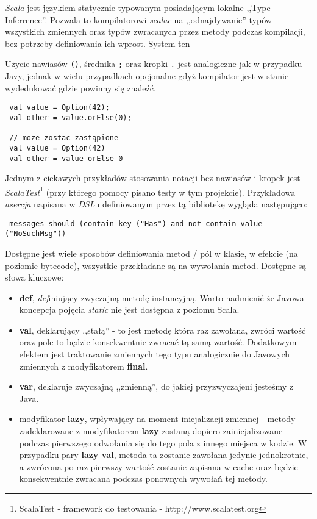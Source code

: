 \textit{Scala} jest językiem statycznie typowanym posiadającym lokalne ,,Type Inferrence''. Pozwala to kompilatorowi 
\textit{scalac} na ,,odnajdywanie'' typów wszystkich zmiennych oraz typów zwracanych przez metody podczas kompilacji,
bez potrzeby definiowania ich wprost. System ten

Użycie nawiasów \verb|()|, średnika \verb|;| oraz kropki \verb|.| jest analogiczne jak w przypadku Javy, 
jednak w wielu przypadkach opcjonalne gdyż kompilator jest w stanie wydedukować gdzie powinny się znaleźć.
\begin{lstlisting}
 val value = Option(42);
 val other = value.orElse(0);

 // moze zostac zastąpione
 val value = Option(42)
 val other = value orElse 0
\end{lstlisting}

Jednym z ciekawych przykładów stosowania notacji bez nawiasów i kropek jest \textit{ScalaTest}\footnote{ScalaTest - framework do testowania - http://www.scalatest.org}
(przy którego pomocy pisano testy w tym projekcie). Przykładowa \textit{asercja} napisana w \textit{DSL}u definiowanym przez tą bibliotekę wygląda następująco:
\begin{lstlisting}
 messages should (contain key ("Has") and not contain value ("NoSuchMsg"))
\end{lstlisting}

Dostępne jest wiele sposobów definiowania metod / pól w klasie,
w efekcie (na poziomie bytecode), wszystkie przekładane są na wywołania metod. Dostępne są słowa kluczowe:
\begin{itemize}
 \item \textbf{def}, \textit{def}iniujący zwyczajną metodę instancyjną. Warto nadmienić że Javowa koncepcja pojęcia \textit{static} nie jest dostępna z poziomu Scala.
 \item \textbf{val}, deklarujący ,,stałą'' - to jest metodę która raz zawołana, zwróci wartość oraz pole to będzie konsekwentnie zwracać tą samą wartość. 
              Dodatkowym efektem jest traktowanie zmiennych tego typu analogicznie do Javowych zmiennych z modyfikatorem \textbf{final}.
 \item \textbf{var}, deklaruje zwyczajną ,,zmienną'', do jakiej przyzwyczajeni jesteśmy z Java.
 \item modyfikator \textbf{lazy}, wpływający na moment inicjalizacji zmiennej - metody zadeklarowane z modyfikatorem \textbf{lazy} 
       zostaną dopiero zainicjalizowane podczas pierwszego odwołania się do tego pola z innego miejsca w kodzie. 
       W przypadku pary \textbf{lazy val}, metoda ta zostanie zawołana jedynie jednokrotnie, a zwrócona po raz pierwszy wartość
       zostanie zapisana w cache oraz będzie konsekwentnie zwracana podczas ponownych wywołań tej metody.
\end{itemize}

